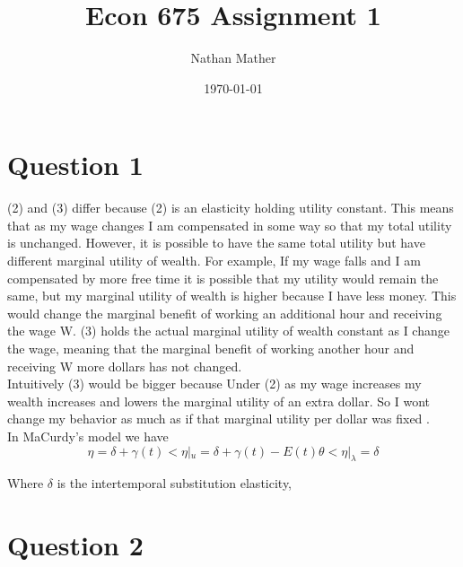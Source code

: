 \documentclass[11pt]{article}
\title{Econ 675 Assignment 1} %
\author{Nathan Mather} %
\date{\today} %
\begin{document}
	
\maketitle %

\setcounter{tocdepth}{2} %




\section{Question 1}

(2) and (3) differ because (2) is an elasticity holding utility constant. This means that as my wage changes I am compensated in some way so that my total utility is unchanged. However, it is possible to have the same total utility but have different marginal utility of wealth. For example, If my wage falls and I am compensated by more free time it is possible that my utility would remain the same, but my marginal utility of wealth is higher because I have less money. This would change the marginal benefit of working an additional hour and receiving the wage W. (3) holds the actual marginal utility of wealth constant as I change the wage, meaning that the marginal benefit of working another hour and receiving W more dollars has not changed. \\

Intuitively (3) would be bigger because Under (2) as my wage increases my wealth increases and lowers the marginal utility of an extra dollar. So I wont change my behavior as much as if that marginal utility per dollar was fixed . \\

In MaCurdy's model we have 
$$ \eta = \delta+\gamma(t) < \eta |_u = \delta + \gamma(t) -E(t) \theta < \eta|_{\lambda} = \delta
$$

Where $\delta$ is the intertemporal substitution elasticity, 



\section{Question 2}
\end{document}
